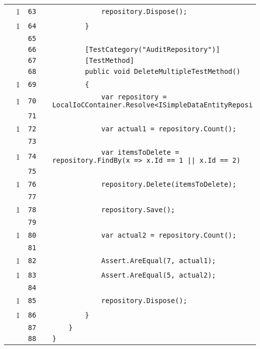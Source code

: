\documentclass[a4paper,10pt]{article}
\begin{document}
\begin{longtable}[l]{lrrll}
\cellcolor{green} & 1 & \verb~63~ & & \verb~            repository.Dispose();~\\
\cellcolor{green} & 1 & \verb~64~ & & \verb~        }~\\
\cellcolor{gray} &  & \verb~65~ & & \verb~~\\
\cellcolor{gray} &  & \verb~66~ & & \verb~        [TestCategory("AuditRepository")]~\\
\cellcolor{gray} &  & \verb~67~ & & \verb~        [TestMethod]~\\
\cellcolor{gray} &  & \verb~68~ & & \verb~        public void DeleteMultipleTestMethod()~\\
\cellcolor{green} & 1 & \verb~69~ & & \verb~        {~\\
\cellcolor{green} & 1 & \verb~70~ & & \verb~            var repository = LocalIoCContainer.Resolve<ISimpleDataEntityReposi~\\
\cellcolor{gray} &  & \verb~71~ & & \verb~~\\
\cellcolor{green} & 1 & \verb~72~ & & \verb~            var actual1 = repository.Count();~\\
\cellcolor{gray} &  & \verb~73~ & & \verb~~\\
\cellcolor{green} & 1 & \verb~74~ & & \verb~            var itemsToDelete = repository.FindBy(x => x.Id == 1 || x.Id == 2)~\\
\cellcolor{gray} &  & \verb~75~ & & \verb~~\\
\cellcolor{green} & 1 & \verb~76~ & & \verb~            repository.Delete(itemsToDelete);~\\
\cellcolor{gray} &  & \verb~77~ & & \verb~~\\
\cellcolor{green} & 1 & \verb~78~ & & \verb~            repository.Save();~\\
\cellcolor{gray} &  & \verb~79~ & & \verb~~\\
\cellcolor{green} & 1 & \verb~80~ & & \verb~            var actual2 = repository.Count();~\\
\cellcolor{gray} &  & \verb~81~ & & \verb~~\\
\cellcolor{green} & 1 & \verb~82~ & & \verb~            Assert.AreEqual(7, actual1);~\\
\cellcolor{green} & 1 & \verb~83~ & & \verb~            Assert.AreEqual(5, actual2);~\\
\cellcolor{gray} &  & \verb~84~ & & \verb~~\\
\cellcolor{green} & 1 & \verb~85~ & & \verb~            repository.Dispose();~\\
\cellcolor{green} & 1 & \verb~86~ & & \verb~        }~\\
\cellcolor{gray} &  & \verb~87~ & & \verb~    }~\\
\cellcolor{gray} &  & \verb~88~ & & \verb~}~\\
\end{longtable}
\newpage
\end{document}
